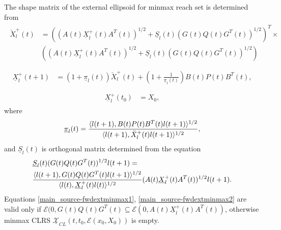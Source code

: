 \documentclass[letterpaper,10pt,english]{sphinxmanual}
\begin{document}
The shape matrix of the external ellipsoid for minmax reach set is
determined from
\label{main_source:equation-fwdextminmax1}\begin{gather}
\begin{split}\breve{X}^+_l(t) & =
\left((A(t)\underline{X}^+_l(t)A^T(t))^{1/2} +
\underline{S}_l(t)(G(t)Q(t)G^T(t))^{1/2}\right)^T
\times \nonumber \\
&\left((A(t)\underline{X}^+_l(t)A^T(t))^{1/2} +
\underline{S}_l(t)(G(t)Q(t)G^T(t))^{1/2}\right)\\\end{split}\label{main_source-fwdextminmax1}
\end{gather}\label{main_source:equation-fwdextminmax2}\begin{gather}
\begin{split}\underline{X}^+_l(t+1) & =
(1+\underline{\pi}_l(t))\breve{X}^+_l(t) +
\left(1+\frac{1}{\underline{\pi}_l(t)}\right)
B(t)P(t)B^T(t),\\\end{split}\label{main_source-fwdextminmax2}
\end{gather}\label{main_source:equation-fwdextminmax3}\begin{gather}
\begin{split}\underline{X}^+_l(t_0) & = X_0,\end{split}\label{main_source-fwdextminmax3}
\end{gather}
where
\begin{gather}
\begin{split}\underline{\pi}_l(t) = \frac{\langle l(t+1),
B(t)P(t)B^T(t)l(t+1)\rangle^{1/2}}{\langle l(t+1),
\breve{X}^+_l(t)l(t+1)\rangle^{1/2}},\end{split}\notag
\end{gather}
and $\underline{S}_l(t)$ is orthogonal matrix determined from the
equation
\begin{gather}
\begin{split}\begin{aligned}
& \underline{S}_l(t)(G(t)Q(t)G^T(t))^{1/2}l(t+1) = \\
& \frac{\langle l(t+1),
G(t)Q(t)G^T(t)l(t+1)\rangle^{1/2}}{\langle l(t),
\underline{X}^+_l(t)l(t)\rangle^{1/2}}(A(t)\underline{X}^+_l(t)A^T(t))^{1/2}l(t+1).\end{aligned}\end{split}\notag
\end{gather}
Equations \eqref{main_source-fwdextminmax1}, \eqref{main_source-fwdextminmax2} are valid only if
${\mathcal E}(0,G(t)Q(t)G^T(t)\subseteq{\mathcal E}(0,A(t)\underline{X}^+_l(t)A^T(t))$,
otherwise minmax CLRS
$\underline{{\mathcal X}}_{CL}(t,t_0,{\mathcal E}(x_0,X_0))$ is
empty.
\end{document}
